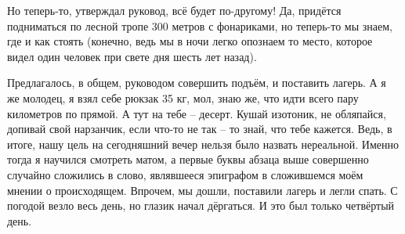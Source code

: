 Но теперь-то, утверждал руковод, всё будет по-другому! Да, придётся подниматься по лесной тропе 300 метров с фонариками, но теперь-то мы знаем, где и как стоять (конечно, ведь мы в ночи легко опознаем то место, которое видел один человек при свете дня шесть лет назад).

Предлагалось, в общем, руководом совершить подъём, 
и поставить лагерь. А я же молодец, я взял себе рюкзак 35 кг, мол, знаю же, что идти всего пару километров по прямой. А тут на тебе – десерт. Кушай изотоник, не обляпайся, допивай свой нарзанчик, если что-то не так – то знай, что тебе кажется. Ведь, в итоге, нашу 
цель на сегодняшний вечер нельзя было назвать нереальной.
Именно тогда я научился смотреть матом, а первые буквы абзаца выше совершенно случайно сложились в слово, являвшееся эпиграфом в сложившемся моём мнении о происходящем.
Впрочем, мы дошли, поставили лагерь и легли спать. С погодой везло весь день, но глазик начал дёргаться. И это был только четвёртый день.
\clearpage